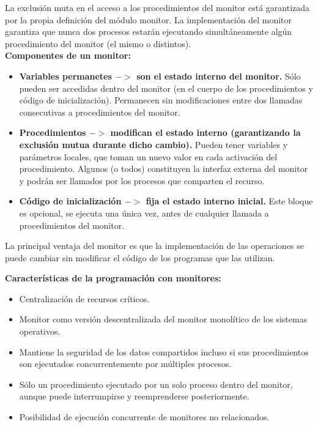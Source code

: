 \documentclass[a4paper,11pt]{article}
\begin{document}
La exclusión muta en el acceso a los procedimientos del monitor está garantizada por la propia definición del módulo monitor. La implementación del monitor garantiza que nunca dos procesos estarán ejecutando simultáneamente algún procedimiento del monitor (el mismo o distintos). \\

\textbf{Componentes de un monitor:}
\begin{itemize}
\item \textbf{Variables permanetes $->$ son el estado interno del monitor.} Sólo pueden ser accedidas dentro del monitor (en el cuerpo de los procedimientos y código de inicialización). Permanecen sin modificaciones entre dos llamadas consecutivas a procedimientos del monitor.

\item \textbf{Procedimientos $->$ modifican el estado interno (garantizando la exclusión mutua durante dicho cambio).} Pueden tener variables y parámetros locales, que toman un nuevo valor en cada activación del procedimiento. Algunos (o todos) constituyen la interfaz externa del monitor y podrán ser llamados por los procesos que comparten el recurso.

\item \textbf{Código de inicialización $->$ fija el estado interno inicial.} Este bloque es opcional, se ejecuta una única vez, antes de cualquier llamada a procedimientos del monitor.
\end{itemize}

La principal ventaja del monitor es que la implementación de las operaciones se puede cambiar sin modificar el código de los programas que las utilizan.

\textbf{Características de la programación con monitores:}

\begin{itemize}
\item Centralización de recursos críticos.
\item Monitor como versión descentralizada del monitor monolítico de los sistemas operativos.
\item Mantiene la seguridad de los datos compartidos incluso si sus procedimientos son ejecutados concurrentemente por múltiples procesos.
\item Sólo un procedimiento ejecutado por un solo proceso dentro del monitor, aunque puede interrumpirse y reemprenderse posteriormente.
\item Posibilidad de ejecución concurrente de monitores no relacionados.
\end{itemize}
\end{document}
